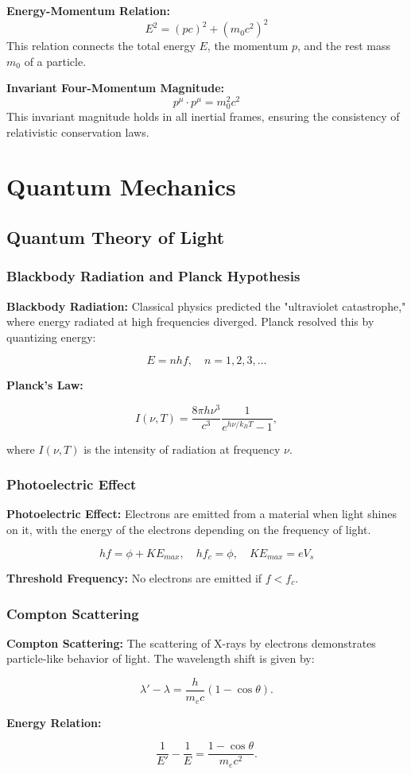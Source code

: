 \documentclass{article}
\newcommand{\eqbox}[1]{\begin{tcolorbox}[colback=gray!10] #1 \end{tcolorbox}}
\newcommand{\conceptbox}[1]{\begin{tcolorbox}[colback=blue!10] #1 \end{tcolorbox}}
\begin{document}
\eqbox{
\textbf{Energy-Momentum Relation:}
\[
E^2 = (pc)^2 + (m_0c^2)^2
\]
This relation connects the total energy \( E \), the momentum \( p \), and the rest mass \( m_0 \) of a particle.
}

\eqbox{
\textbf{Invariant Four-Momentum Magnitude:}
\[
p^\mu \cdot p^\mu = m_0^2 c^2
\]
This invariant magnitude holds in all inertial frames, ensuring the consistency of relativistic conservation laws.
}
\newpage
\section{Quantum Mechanics}

\subsection{Quantum Theory of Light}

\subsubsection{Blackbody Radiation and Planck Hypothesis}
\conceptbox{
\textbf{Blackbody Radiation:} 
Classical physics predicted the "ultraviolet catastrophe," where energy radiated at high frequencies diverged. Planck resolved this by quantizing energy:
\eqbox{
\[
E = nhf, \quad n = 1, 2, 3, \dots
\]}
\textbf{Planck's Law:}
\eqbox{
\[
I(\nu, T) = \frac{8\pi h\nu^3}{c^3}\frac{1}{e^{h\nu/k_BT} - 1},
\]
}
where \( I(\nu, T) \) is the intensity of radiation at frequency \( \nu \).
}

\subsubsection{Photoelectric Effect}
\conceptbox{
\textbf{Photoelectric Effect:}
Electrons are emitted from a material when light shines on it, with the energy of the electrons depending on the frequency of light.
\eqbox{
\[
hf = \phi + KE_{max}, \quad hf_c = \phi, \quad KE_{max} = eV_s
\]}
\textbf{Threshold Frequency:} No electrons are emitted if \( f < f_c \).
}

\subsubsection{Compton Scattering}
\conceptbox{
\textbf{Compton Scattering:}
The scattering of X-rays by electrons demonstrates particle-like behavior of light. The wavelength shift is given by:
\eqbox{
\[
\lambda' - \lambda = \frac{h}{m_ec}(1 - \cos\theta).
\]}
\textbf{Energy Relation:}
\eqbox{
\[
\frac{1}{E'} - \frac{1}{E} = \frac{1 - \cos\theta}{m_ec^2}.
\]
}
}
\newpage
\end{document}
